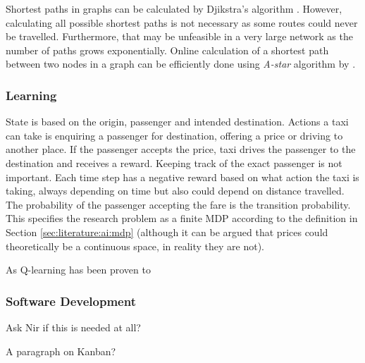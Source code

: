 Shortest paths in graphs can be calculated by Djikstra's algorithm
\parencite{Cormen2009algorithms}. However, calculating all possible shortest
paths is not necessary as some routes could never be travelled. Furthermore,
that may be unfeasible in a very large network as the number of paths grows
exponentially. Online calculation of a shortest path between two nodes in a
graph can be efficiently done using \textit{A-star} algorithm by
\textcite{Hart1968paths}.


\subsubsection{Learning}

State is based on the origin, passenger and intended destination. Actions a
taxi can take is enquiring a passenger for destination, offering a price or
driving to another place. If the passenger accepts the price, taxi drives the
passenger to the destination and receives a reward. Keeping track of the exact
passenger is not important. Each time step has a negative reward based on what
action the taxi is taking, always depending on time but also could depend on
distance travelled. The probability of the passenger accepting the fare is the
transition probability. This specifies the research problem as a finite MDP
according to the definition in Section \ref{sec:literature:ai:mdp} (although it
can be argued that prices could theoretically be a continuous space, in reality
they are not).

As Q-learning has been proven to 

\subsubsection{Software Development}
Ask Nir if this is needed at all?

A paragraph on Kanban? \parencite{Anderson2010kanban}